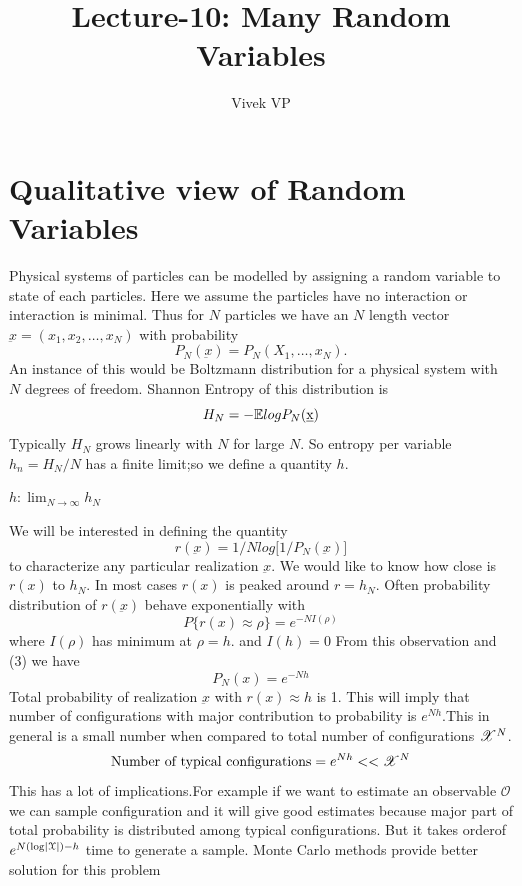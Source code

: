 \documentclass[letterpaper,english,12pt]{article}
\title{Lecture-10: Many Random Variables}
\author{Vivek VP}
\begin{document}
\maketitle
\section{Qualitative view of Random Variables}
Physical systems of particles can be modelled by assigning a random variable to state of each particles. Here we assume the particles have no interaction or interaction is minimal. Thus for $N$ particles we have an $N$ length vector $\underbar x = (x_1,x_2,\dots ,x_N)$ with probability 
\begin{equation}
  P_N(\underbar x) = P_N(X_1,\dots ,x_N) .
\end{equation}
An instance of this would be Boltzmann distribution for a physical system with $N$ degrees of freedom. Shannon Entropy of this distribution is 
  \begin{equation}
      H_N = -\mathbb{E} {log P_N(\underbar x) }
  \end{equation}
  Typically $H_N$ grows linearly with $N$ for large $N$. So entropy per variable $h_n=H_N/N$ has a finite limit;so we define a quantity $h$.
  
 \begin{defn}
 	$h: \lim_{N\to\infty} h_N$
 \end{defn}
  We will be interested in defining the quantity 
  \begin{equation}
      r(\underbar x) = 1/N log \big[ 1/P_N(\underbar x)\big]
  \end{equation}
  to characterize any particular realization $\underbar{x}$. We would like to know how close is $r(x)$ to $h_N$. In most cases $r(x)$ is peaked around $r=h_N$. Often probability distribution of $r(\underbar x)$ behave exponentially with 
  \begin{equation}
   P\lbrace r(x) \approx \rho \rbrace=e^{-NI(\rho)}
   \end{equation}
   where
   $I(\rho)$ has minimum at $\rho = h$.
   and $I(h)=0$
   From this observation and (3) we have 
   \begin{equation}
       P_N(x) = e^{-Nh}
   \end{equation}
   Total probability of realization $\underbar x$ with $r(x) \approx h$ is 1. This will imply that number of configurations with major contribution to probability is $e^{Nh}. $This in general is a  small number when compared to total number of configurations $\mathscr{X}^N$. 
   \begin{equation}
   	\text{Number of typical configurations}=e^{Nh}<<\mathscr{X}^N
   \end{equation}
   This has a lot of implications.For example if we want to estimate an observable $\mathcal{O}$ we can sample configuration and it will give good estimates because major part of total probability is distributed among typical configurations. But it takes orderof $e^{N(\log\left\lvert\mathcal{X}\right\rvert)-h}$ time to generate a sample. Monte Carlo methods provide better solution for this problem
\end{document}
